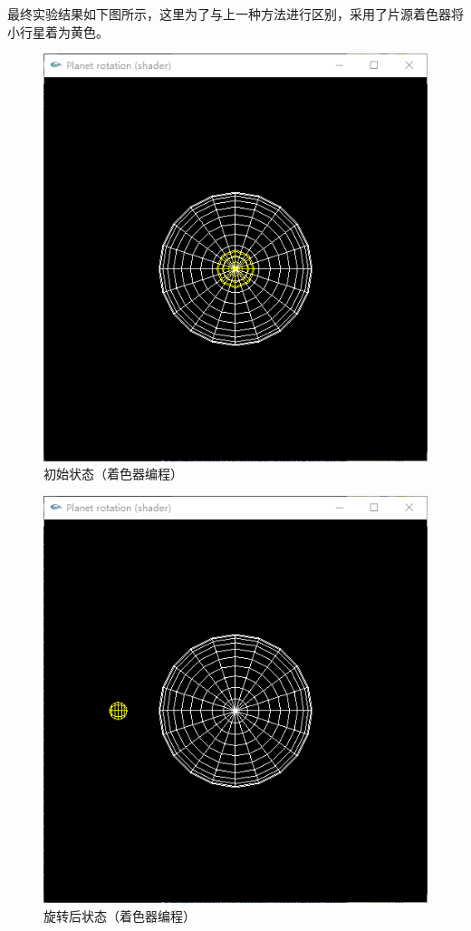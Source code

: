\documentclass[logo,reportComp]{thesis}
\begin{document}
最终实验结果如下图所示，这里为了与上一种方法进行区别，采用了片源着色器将小行星着为黄色。
\begin{figure}[H]
\centering
\includegraphics[width=0.6\linewidth]{fig/initial_state_shader.png}
\caption{初始状态（着色器编程）}
\end{figure}
\begin{figure}[H]
\centering
\includegraphics[width=0.6\linewidth]{fig/rotate_state_shader.png}
\caption{旋转后状态（着色器编程）}
\end{figure}
\end{document}
